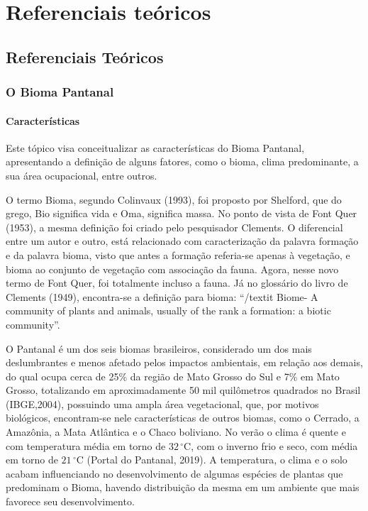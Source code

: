 \part{Referenciais teóricos}

\chapter{Referenciais Teóricos}

\section{O Bioma Pantanal}

	\subsection{Características}
	
		Este tópico visa conceitualizar as características do Bioma Pantanal,  apresentando a definição de alguns fatores, como o bioma, clima predominante, a sua área ocupacional, entre outros.
		 		 
 		O termo Bioma, segundo Colinvaux (1993), foi proposto por Shelford, que do grego, Bio significa vida e  Oma, significa massa. No ponto de vista de Font Quer (1953), a mesma definição foi criado pelo pesquisador Clements. O diferencial entre um autor e outro, está relacionado com caracterização da palavra formação e da palavra bioma, visto que antes a formação referia-se apenas à vegetação, e bioma ao conjunto de vegetação com associação da fauna. Agora, nesse novo termo de Font Quer, foi totalmente incluso a fauna. Já no glossário do livro de Clements (1949), encontra-se a definição para bioma: “/textit {Biome- A community of plants and animals, usually of the rank a formation: a biotic community}”.
 		 
 		O Pantanal é um dos seis biomas brasileiros, considerado um dos mais deslumbrantes e menos afetado pelos impactos ambientais, em relação aos demais, do qual ocupa cerca de 25\% da região de Mato Grosso do Sul e 7\% em Mato Grosso, totalizando em aproximadamente 50 mil quilômetros quadrados no Brasil (IBGE,2004), possuindo uma ampla área vegetacional, que, por motivos biológicos, encontram-se nele características de outros biomas, como o Cerrado, a Amazônia, a Mata Atlântica e o Chaco boliviano. No verão o clima é quente e com temperatura média em torno de $32\,^{\circ}\mathrm{C}$, com o inverno frio e seco, com média em torno de $21\,^{\circ}\mathrm{C}$ (Portal do Pantanal, 2019). A temperatura, o clima e o solo  acabam influenciando no desenvolvimento de algumas espécies de plantas que predominam o Bioma, havendo distribuição da mesma em um ambiente que mais favorece seu desenvolvimento.
 		 
